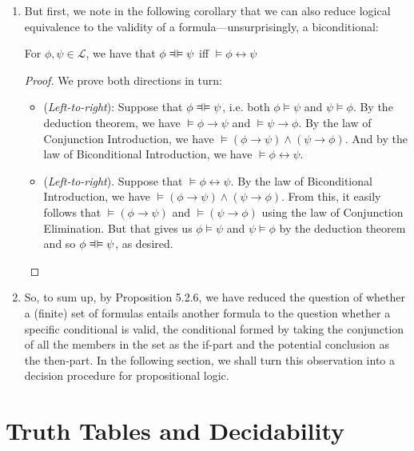 \begin{enumerate}[\thesection.1]
	\item But first, we note in the following corollary that we can also reduce logical equivalence to the validity of a formula---unsurprisingly, a biconditional:
	\begin{corollary}
	For $\phi,\psi\in\mathcal{L}$, we have that $\phi\equi \psi$ iff $\vDash\phi\leftrightarrow\psi$
	\end{corollary}
	\begin{proof}
	We prove both directions in turn:
	\begin{itemize}
	
		\item (\emph{Left-to-right}): Suppose that $\phi\equi \psi$, i.e. both $\phi\vDash\psi$ and $\psi\vDash\phi$. By the deduction theorem, we have $\vDash \phi\to\psi$ and $\vDash\psi\to\phi$. By the law of Conjunction Introduction, we have $\vDash (\phi\to\psi)\land(\psi\to\phi)$. And by the law of Biconditional Introduction, we have $\vDash\phi\leftrightarrow\psi$.
		
		\item (\emph{Left-to-right}). Suppose that $\vDash\phi\leftrightarrow\psi$. By the law of Biconditional Introduction, we have $\vDash (\phi\to\psi)\land(\psi\to\phi)$. From this, it easily follows that $\vDash (\phi\to\psi)$ and $\vDash(\psi\to\phi)$ using the law of Conjunction Elimination. But that gives us $\phi\vDash\psi$ and $\psi\vDash\phi$ by the deduction theorem and so $\phi\equi\psi$, as desired.
	
	\end{itemize}
	\end{proof}
	
	\item So, to sum up, by Proposition 5.2.6, we have reduced the question of whether a (finite) set of formulas entails another formula to the question whether a specific conditional is valid, the conditional formed by taking the conjunction of all the members in the set as the if-part and the potential conclusion as the then-part. In the following section, we shall turn this observation into a decision procedure for propositional logic.
			
	\end{enumerate}

\section{Truth Tables and Decidability}

